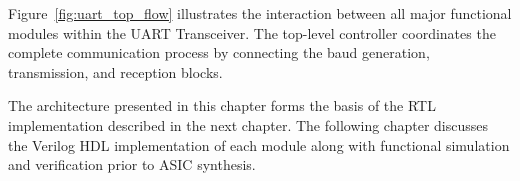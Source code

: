 Figure~\ref{fig:uart_top_flow} illustrates the interaction between all major functional modules within the UART Transceiver. The top-level controller coordinates the complete communication process by connecting the baud generation, transmission, and reception blocks.

The architecture presented in this chapter forms the basis of the RTL implementation described in the next chapter. The following chapter discusses the Verilog HDL implementation of each module along with functional simulation and verification prior to ASIC synthesis.

\clearpage